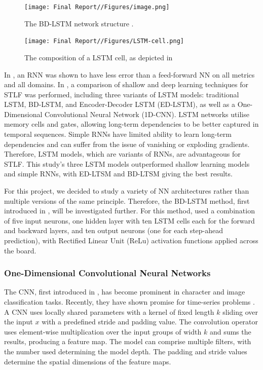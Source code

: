 \documentclass[mstat,12pt]{unswthesis}
\begin{document}
\begin{figure}[H]
    \centering
    \texttt{[image: Final Report//Figures/image.png]}
    \caption{The BD-LSTM network structure \cite{Chandra2021}.}
    \label{BDLSTM}
\end{figure}

\begin{figure}[H]
    \centering
    \texttt{[image: Final Report//Figures/LSTM-cell.png]}
    \caption{The composition of a LSTM cell, as depicted in \cite{Chandra2021}}
    \label{LSTMcell}
\end{figure}

In \cite{Din2017}, an RNN was shown to have less error than a feed-forward NN on all metrics and all domains. In \cite{Chandra2021}, a comparison of shallow and deep learning techniques for STLF was performed, including three variants of LSTM models: traditional LSTM, BD-LSTM,  and Encoder-Decoder LSTM (ED-LSTM), as well as a One-Dimensional Convolutional Neural Network (1D-CNN). LSTM networks utilise memory cells and gates, allowing long-term dependencies to be better captured in temporal sequences. Simple RNNs have limited ability to learn long-term dependencies and can suffer from the issue of vanishing or exploding gradients. Therefore, LSTM models, which are variants of RNNs, are advantageous for STLF. This study's three LSTM models outperformed shallow learning models and simple RNNs, with ED-LTSM and BD-LTSM giving the best results. 

For this project, we decided to study a variety of NN architectures rather than multiple versions of the same principle. Therefore, the BD-LSTM method, first introduced in \cite{Schuster1997}, will be investigated further. For this method, \cite{Chandra2021} used a combination of five input neurons, one hidden layer with ten LSTM cells each for the forward and backward layers, and ten output neurons (one for each step-ahead prediction), with Rectified Linear Unit (ReLu) activation functions applied across the board. 

\subsubsection{One-Dimensional Convolutional Neural Networks}
The CNN, first introduced in \cite{LeCun1990}\cite{LeCun1998}, has become prominent in character and image classification tasks. Recently, they have shown promise for time-series problems \cite{Shi2015}\cite{Wang2017}. A CNN uses locally shared parameters with a kernel of fixed length $k$ sliding over the input $x$ with a predefined stride and padding value. The convolution operator uses element-wise multiplication over the input groups of width $k$ and sums the results, producing a feature map. The model can comprise multiple filters, with the number used determining the model depth. The padding and stride values determine the spatial dimensions of the feature maps. 
\end{document}
